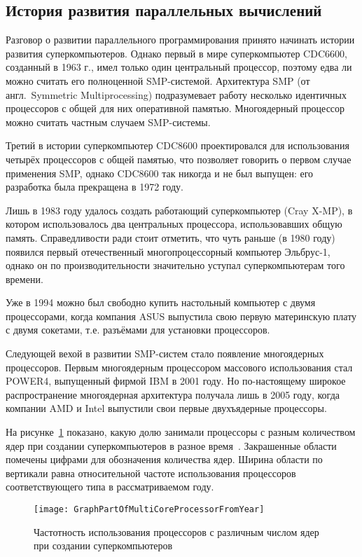\subsection{История развития параллельных вычислений}

Разговор о развитии параллельного программирования принято начинать истории развития суперкомпьютеров.
Однако первый в мире суперкомпьютер CDC6600, созданный в 1963 г., имел только один центральный процессор, поэтому едва ли можно считать его полноценной SMP-системой.
Архитектура SMP (от англ.\ Symmetric Multiprocessing) подразумевает работу несколько идентичных процессоров с общей для них оперативной памятью.
Многоядерный процессор можно считать частным случаем SMP-системы.

Третий в истории суперкомпьютер CDC8600 проектировался для использования четырёх процессоров с общей памятью, что позволяет говорить о первом случае применения SMP, однако CDC8600 так никогда и не был выпущен: его разработка была прекращена в 1972 году.

Лишь в 1983 году удалось создать работающий суперкомпьютер (Cray X-MP), в котором использовалось два центральных процессора, использовавших общую память.
Справедливости ради стоит отметить, что чуть раньше (в 1980 году) появился первый отечественный многопроцессорный компьютер Эльбрус-1, однако он по производительности значительно уступал суперкомпьютерам того времени.

Уже в 1994 можно был свободно купить настольный компьютер с двумя процессорами, когда компания ASUS выпустила свою первую материнскую плату с двумя сокетами, т.е. разъёмами для установки процессоров.

Следующей вехой в развитии SMP-систем стало появление многоядерных процессоров.
Первым многоядерным процессором массового использования стал POWER4, выпущенный фирмой IBM в 2001 году.
Но по-настоящему широкое распространение многоядерная архитектура получала лишь в 2005 году, когда компании AMD и Intel выпустили свои первые двухъядерные процессоры.

На рисунке~\ref{GraphPartOfMultiCoreProcessorFromYear:image} показано, какую долю занимали процессоры с разным количеством ядер при создании суперкомпьютеров в разное время~\cite{Top500}. %
Закрашенные области помечены цифрами для обозначения количества ядер.
Ширина области по вертикали равна относительной частоте использования процессоров соответствующего типа в рассматриваемом году.

\begin{figure}[H]
    \centering
    \texttt{[image: GraphPartOfMultiCoreProcessorFromYear]}
    \caption{Частотность использования процессоров с различным числом ядер при создании суперкомпьютеров}
    \label{GraphPartOfMultiCoreProcessorFromYear:image}
\end{figure}

